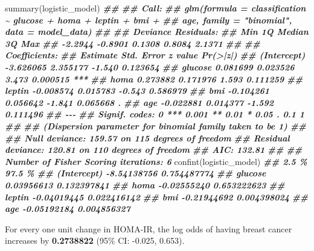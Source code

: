 \documentclass[
]{article}
\newenvironment{Shaded}{\begin{snugshade}}{\end{snugshade}}
\newcommand{\DocumentationTok}[1]{\textcolor[rgb]{0.56,0.35,0.01}{\textbf{\textit{#1}}}}
\newcommand{\FunctionTok}[1]{\textcolor[rgb]{0.00,0.00,0.00}{#1}}
\newcommand{\NormalTok}[1]{#1}
\begin{document}
\begin{Shaded}
\begin{Highlighting}[]
\FunctionTok{summary}\NormalTok{(logistic\_model)}
\DocumentationTok{\#\# }
\DocumentationTok{\#\# Call:}
\DocumentationTok{\#\# glm(formula = classification \textasciitilde{} glucose + homa + leptin + bmi + }
\DocumentationTok{\#\#     age, family = "binomial", data = model\_data)}
\DocumentationTok{\#\# }
\DocumentationTok{\#\# Deviance Residuals: }
\DocumentationTok{\#\#     Min       1Q   Median       3Q      Max  }
\DocumentationTok{\#\# {-}2.2944  {-}0.8901   0.1308   0.8084   2.1371  }
\DocumentationTok{\#\# }
\DocumentationTok{\#\# Coefficients:}
\DocumentationTok{\#\#              Estimate Std. Error z value Pr(\textgreater{}|z|)    }
\DocumentationTok{\#\# (Intercept) {-}3.626065   2.355177  {-}1.540 0.123654    }
\DocumentationTok{\#\# glucose      0.081699   0.023526   3.473 0.000515 ***}
\DocumentationTok{\#\# homa         0.273882   0.171976   1.593 0.111259    }
\DocumentationTok{\#\# leptin      {-}0.008574   0.015783  {-}0.543 0.586979    }
\DocumentationTok{\#\# bmi         {-}0.104261   0.056642  {-}1.841 0.065668 .  }
\DocumentationTok{\#\# age         {-}0.022881   0.014377  {-}1.592 0.111496    }
\DocumentationTok{\#\# {-}{-}{-}}
\DocumentationTok{\#\# Signif. codes:  0 \textquotesingle{}***\textquotesingle{} 0.001 \textquotesingle{}**\textquotesingle{} 0.01 \textquotesingle{}*\textquotesingle{} 0.05 \textquotesingle{}.\textquotesingle{} 0.1 \textquotesingle{} \textquotesingle{} 1}
\DocumentationTok{\#\# }
\DocumentationTok{\#\# (Dispersion parameter for binomial family taken to be 1)}
\DocumentationTok{\#\# }
\DocumentationTok{\#\#     Null deviance: 159.57  on 115  degrees of freedom}
\DocumentationTok{\#\# Residual deviance: 120.81  on 110  degrees of freedom}
\DocumentationTok{\#\# AIC: 132.81}
\DocumentationTok{\#\# }
\DocumentationTok{\#\# Number of Fisher Scoring iterations: 6}
\FunctionTok{confint}\NormalTok{(logistic\_model) }
\DocumentationTok{\#\#                   2.5 \%      97.5 \%}
\DocumentationTok{\#\# (Intercept) {-}8.54138756 0.754487774}
\DocumentationTok{\#\# glucose      0.03956613 0.132397841}
\DocumentationTok{\#\# homa        {-}0.02555240 0.653222623}
\DocumentationTok{\#\# leptin      {-}0.04019445 0.022416142}
\DocumentationTok{\#\# bmi         {-}0.21944692 0.004398024}
\DocumentationTok{\#\# age         {-}0.05192184 0.004856327}
\end{Highlighting}
\end{Shaded}

For every one unit change in HOMA-IR, the log odds of having breast
cancer increases by \textbf{0.2738822} (95\% CI: -0.025, 0.653).
\end{document}
